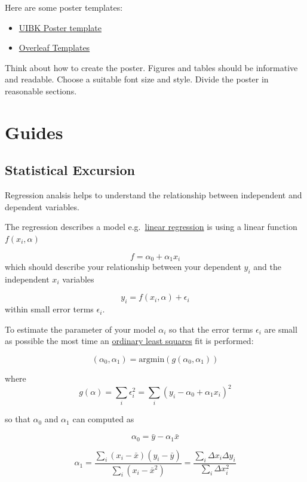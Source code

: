 \documentclass[
  letterpaper,
  DIV=11,
  numbers=noendperiod]{scrreprt}
\providecommand{\tightlist}{%
  \setlength{\itemsep}{0pt}\setlength{\parskip}{0pt}}\usepackage{longtable,booktabs,array}
\begin{document}
Here are some poster templates:

\begin{itemize}
\tightlist
\item
  \href{https://www.uibk.ac.at/de/public-relations/services/dokumentvorlagen/}{UIBK
  Poster template}
\item
  \href{https://www.overleaf.com/gallery/tagged/poster}{Overleaf
  Templates}
\end{itemize}

Think about how to create the poster. Figures and tables should be
informative and readable. Choose a suitable font size and style. Divide
the poster in reasonable sections.

\part{Guides}

\hypertarget{statistical-excursion}{%
\chapter{Statistical Excursion}\label{statistical-excursion}}

Regression analsis helps to understand the relationship between
independent and dependent variables.

The regression describes a model
e.g.~\href{https://en.wikipedia.org/wiki/Simple_linear_regression}{linear
regression} is using a linear function \(f(x_i,\alpha)\)

\[
f = \alpha_{0} + \alpha_{1} x_i
\] which should describe your relationship between your dependent
\(y_i\) and the independent \(x_i\) variables

\[
y_i = f(x_i,\alpha) + \epsilon_i
\] within small error terms \(\epsilon_i\).

To estimate the parameter of your model \(\alpha_i\) so that the error
terms \(\epsilon_i\) are small as possible the most time an
\href{https://en.wikipedia.org/wiki/Ordinary_least_squares}{ordinary
least squares} fit is performed:

\[
(\alpha_0,\alpha_1) = \mathrm{argmin}(g(\alpha_0, \alpha_1))
\]

where \[
g(\alpha) = \sum_i \epsilon_i^2 = \sum_i (y_i - \alpha_0 + \alpha_1 x_i)^2
\]

so that \(\alpha_0\) and \(\alpha_1\) can computed as

\[
\alpha_0 = \bar{y} -\alpha_1 \bar{x}
\]

\[
\alpha_1 = \frac{\sum_i (x_i - \bar{x})(y_i - \bar{y})}{\sum_i (x_i - \bar{x}^2)} = \frac{\sum_i \Delta x_i \Delta y_i}{\sum_i \Delta x_i^2}
\]
\end{document}
